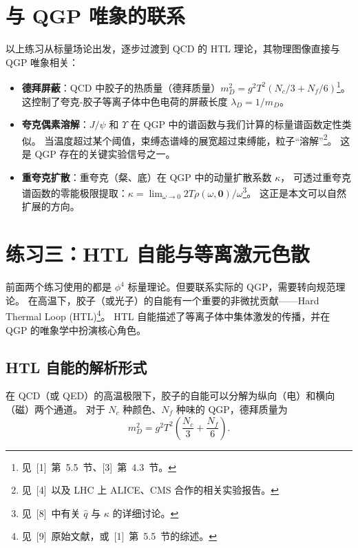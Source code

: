 \documentclass[12pt,a4paper]{article}
\begin{document}
\section{与 QGP 唯象的联系}

以上练习从标量场论出发，逐步过渡到 QCD 的 HTL 理论，其物理图像直接与 QGP 唯象相关：

\begin{itemize}[nosep]
\item \textbf{德拜屏蔽}：QCD 中胶子的热质量（德拜质量）$m_D^2 = g^2T^2(N_c/3 + N_f/6)$\footnote{见~[1]~第~5.5~节、[3]~第~4.3~节。}。
这控制了夸克-胶子等离子体中色电荷的屏蔽长度 $\lambda_D = 1/m_D$。

\item \textbf{夸克偶素溶解}：$J/\psi$ 和 $\Upsilon$ 在 QGP 中的谱函数与我们计算的标量谱函数定性类似。
当温度超过某个阈值，束缚态谱峰的展宽超过束缚能，粒子“溶解”\footnote{见~[4]~以及 LHC 上 ALICE、CMS 合作的相关实验报告。}。
这是 QGP 存在的关键实验信号之一。

\item \textbf{重夸克扩散}：重夸克（粲、底）在 QGP 中的动量扩散系数 $\kappa$，
可透过重夸克谱函数的零能极限提取：$\kappa = \lim_{\omega\to0} 2T\rho(\omega, \mathbf{0})/\omega$\footnote{见~[8]~中有关 $\hat q$ 与 $\kappa$ 的详细讨论。}。
这正是本文可以自然扩展的方向。
\end{itemize}

\section{练习三：HTL 自能与等离激元色散}

前面两个练习使用的都是 $\phi^4$ 标量理论。但要联系实际的 QGP，需要转向规范理论。
在高温下，胶子（或光子）的自能有一个重要的非微扰贡献——Hard Thermal Loop (HTL)\footnote{见~[9]~原始文献，或~[1]~第~5.5~节的综述。}。
HTL 自能描述了等离子体中集体激发的传播，并在 QGP 的唯象学中扮演核心角色。

\subsection{HTL 自能的解析形式}

在 QCD（或 QED）的高温极限下，胶子的自能可以分解为纵向（电）和横向（磁）两个通道。
对于 $N_c$ 种颜色、$N_f$ 种味的 QGP，德拜质量为
\begin{equation}
m_D^2 = g^2 T^2 \left(\frac{N_c}{3} + \frac{N_f}{6}\right).
\label{eq:debye-mass}
\end{equation}
\end{document}
